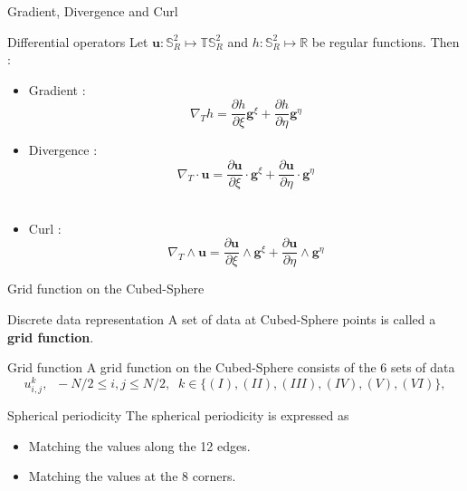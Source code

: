 \documentclass[11pt]{beamer}
\begin{document}
\begin{frame}{Gradient, Divergence and Curl}

\begin{block}{Differential operators}
Let $\mathbf{u} : \mathbb{S}_R^2 \mapsto \mathbb{T}\mathbb{S}_R^2$ and $h : \mathbb{S}_R^2 \mapsto \mathbb{R}$ be regular functions. Then :
\begin{itemize}
\item Gradient :
\begin{equation}
\nabla_T h = \dfrac{\partial h}{\partial \xi} \mathbf{g}^{\xi} + \dfrac{\partial h}{\partial \eta} \mathbf{g}^{\eta}
\end{equation}
\item Divergence :
\begin{equation}
\nabla_T \cdot \mathbf{u} = \dfrac{\partial \mathbf{u}}{\partial \xi}\cdot \mathbf{g}^{\xi} + \dfrac{\partial \mathbf{u}}{\partial \eta} \cdot \mathbf{g}^{\eta}
\end{equation}\\
\item Curl :
\begin{equation}
\nabla_T \wedge \mathbf{u} = \dfrac{\partial \mathbf{u}}{\partial \xi}\wedge \mathbf{g}^{\xi} + \dfrac{\partial \mathbf{u}}{\partial \eta} \wedge \mathbf{g}^{\eta}
\end{equation}

\end{itemize}

\end{block}
\end{frame}


\begin{frame}{Grid function on the Cubed-Sphere}

\begin{block}{Discrete data representation}
A set of data at Cubed-Sphere points is called a \textbf{grid function}.
\end{block}

\begin{block}{Grid function}
A grid function on the Cubed-Sphere consists of the 6
sets of data
\begin{equation}
u^k_{i,j},\;\; -N/2 \leq i,j\leq N/2,\;\; k\in\lbrace (I),(II),(III),(IV),(V),(VI) \rbrace,
\end{equation}
\end{block}
\begin{block}{Spherical periodicity}
The spherical periodicity is expressed as 
\begin{itemize}
\item Matching the values along the 12 edges.
\item Matching the values at the 8 corners.
\end{itemize}
\end{block}
\end{frame}
\end{document}
